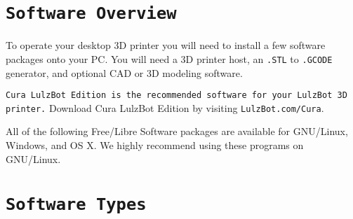 %
%
%
%
%

\section{\texttt{Software Overview}}

To operate your desktop 3D printer you will need to install a few software packages onto your PC. You will need a 3D printer host, an \texttt{.STL} to \texttt{.GCODE} generator, and optional CAD or 3D modeling software.

\texttt{Cura LulzBot Edition is the recommended software for your LulzBot 3D printer.} Download Cura LulzBot Edition by visiting \texttt{LulzBot.com/Cura}.



All of the following Free/Libre Software packages are available for GNU/Linux, Windows, and OS X. We highly recommend using these programs on GNU/Linux.

\section{\texttt{Software Types}}

